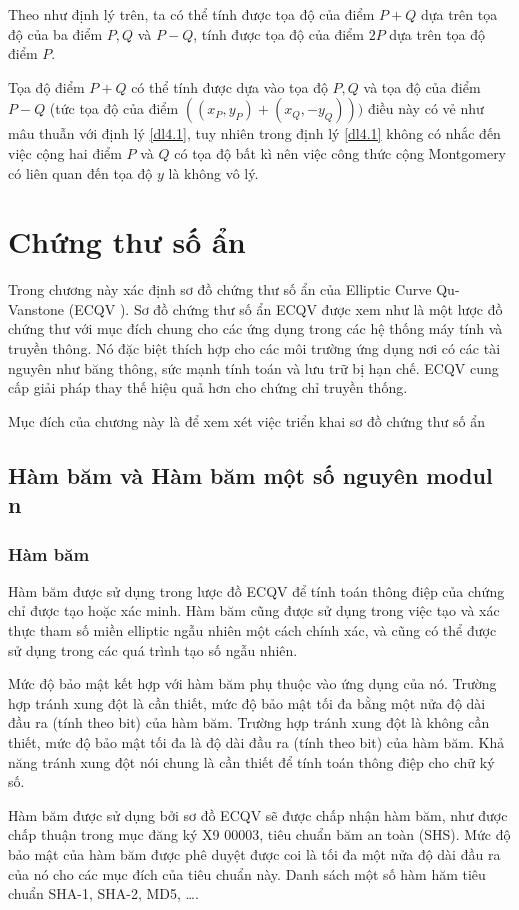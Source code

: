 \documentclass[a4paper,12pt]{report}
\begin{document}
Theo như định lý trên, ta có thể tính được tọa độ của điểm $P + Q$ dựa trên tọa độ của ba điểm $P, Q$ và $P-Q$, tính được tọa độ của điểm $2P$ dựa trên tọa độ điểm $P$.

Tọa độ điểm $P+Q$ có thể tính được dựa vào tọa độ $P, Q$ và tọa độ của điểm $P-Q$ (tức tọa độ của điểm $((x_P, y_P) + (x_Q, -y_Q)))$ điều này có vẻ như mâu thuẫn với định lý \ref{dl4.1}, tuy nhiên trong định lý \ref{dl4.1} không có nhắc đến việc cộng hai điểm $P$ và $Q$ có tọa độ bất kì nên việc công thức cộng Montgomery có liên quan đến tọa độ $y$ là không vô lý.
\chapter{Chứng thư số ẩn}
Trong chương này xác định sơ đồ chứng thư số ẩn của Elliptic Curve Qu-Vanstone (ECQV ). Sơ đồ chứng thư số ẩn ECQV được xem như là một lược đồ chứng thư với mục đích chung cho các ứng dụng trong các hệ thống máy tính và truyền thông. Nó đặc biệt thích hợp cho các môi trường ứng dụng nơi có các tài nguyên như băng thông, sức mạnh tính toán và lưu trữ bị hạn chế. ECQV cung cấp giải pháp thay thế hiệu quả hơn cho chứng chỉ truyền thống.

Mục đích của chương này là để xem xét việc triển khai sơ đồ chứng thư số ẩn 
\section{Hàm băm và Hàm băm một số nguyên modul n}
\subsection*{Hàm băm}
Hàm băm được sử dụng trong lược đồ ECQV để tính toán thông điệp của chứng chỉ được tạo hoặc xác minh. Hàm băm cũng được sử dụng trong việc tạo và xác thực tham số miền elliptic ngẫu nhiên một cách chính xác, và cũng có thể được sử dụng trong các quá trình tạo số ngẫu nhiên.

Mức độ bảo mật kết hợp với hàm băm phụ thuộc vào ứng dụng của nó. Trường hợp tránh xung đột là cần thiết, mức độ bảo mật tối đa bằng một nửa độ dài đầu ra (tính theo bit) của hàm băm. Trường hợp tránh xung đột là không cần thiết, mức độ bảo mật tối đa là độ dài đầu ra (tính theo bit) của hàm băm. Khả năng tránh xung đột nói chung là cần thiết để tính toán thông điệp cho chữ ký số.

Hàm băm được sử dụng bởi sơ đồ ECQV sẽ được chấp nhận hàm băm, như được chấp thuận trong mục đăng ký X9 00003, tiêu chuẩn băm an toàn (SHS). Mức độ bảo mật của hàm băm được phê duyệt được coi là tối đa một nửa độ dài đầu ra của nó cho các mục đích của tiêu chuẩn này. Danh sách một số hàm hăm tiêu chuẩn SHA-1, SHA-2, MD5, \ldots.
\end{document}
